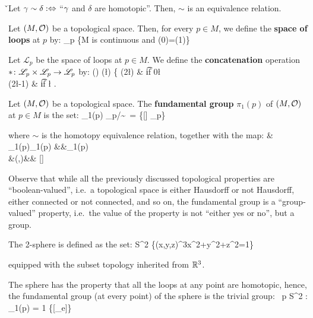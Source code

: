 \v

\bt[]
Let $\gamma \sim \delta :\Leftrightarrow$ ``$\gamma$ and $\delta$ are homotopic''. Then, $\sim$ is an equivalence relation.
\et

Let $(M,\mathcal{O})$ be a topological space. Then, for every $p\in M$, we define the \textbf{space of loops} at $p$ by:
\bse
{}_p \coloneqq \{\g\cl[0,1]\to M \mid \g \t{ is continuous and } \g(0)=\g(1)\}
\ese
\ed

\bd [Concatenation]
Let $\mathscr{L}_p$ be the space of loops at $p\in M$. We define the \textbf{concatenation} operation $*\colon
\mathscr{L}_p\times\mathscr{L}_p\to\mathscr{L}_p$ by:
\bse
(\g * \delta) (\l) \coloneqq \left\{  \g(2\l) & \t{if } 0\leq \l \leq {}\\ \delta(2\l-1) & \t{if }
\leq \l {} \ea \right.
\ese
\ed

Let $(M,\mathcal{O})$ be a topological space. The \textbf{fundamental group} $\pi_1(p)$ of $(M,\mathcal{O})$ at $p\in M$ is the set:
\bse
\pi_1(p) \coloneqq {}_p/\!\sim\ = \{[\g] \mid \g \in {}_p\}
\ese

where $\sim$ is the homotopy equivalence relation, together with the map:
\bullet \cl & \pi_1(p)\times \pi_1(p) &\to &\pi_1(p)\\&(\g,\delta)&\mapsto & [\g]\bullet[\delta] \coloneqq [\g*\delta]
\ei
\ed

Observe that while all the previously discussed topological properties are ``boolean-valued'', i.e.\ a topological
space is either Hausdorff or not Hausdorff, either connected or not connected, and so on, the fundamental group is a
``group-valued'' property, i.e.\ the value of the property is not ``either yes or no'', but a group.

\be
The 2-sphere is defined as the set:
\bse
S^2 \coloneqq \{(x,y,z)\in \R^3\mid x^2+y^2+z^2=1\}
\ese

equipped with the subset topology inherited from $\mathbb{R}^3$.

\begin{center}
\end{center}

The sphere has the property that all the loops at any point are homotopic, hence, the fundamental group (at every
point) of the sphere is the trivial group:
\bse
\forall \, p \in S^2 : \pi_1(p) = 1 \coloneqq \{[\g_e]\}
\ese
\ee


